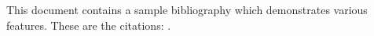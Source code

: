 \documentclass{article}
\begin{document}
This document contains a sample bibliography which demonstrates various features.
These are the citations: \cite{book_test,article_test,inproceedings_test}.



\end{document}

